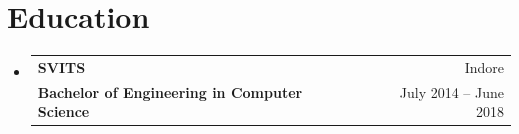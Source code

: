 \documentclass[letterpaper,11pt]{article}
\makeatletter
\newcommand{\resumeSubheading}[4]{
  \vspace{-2pt}\item
    \begin{tabular*}{0.97\textwidth}[t]{l@{\extracolsep{\fill}}r}
      \textbf{#1} & #2 \\
      \textbf{\small#3} & \textnormal{\small #4} \\
    \end{tabular*}\vspace{-7pt}
}
\newcommand{\resumeSubHeadingListStart}{\begin{itemize}[leftmargin=0.15in, label={}]}
\newcommand{\resumeSubHeadingListEnd}{\end{itemize}}
\makeatother
\begin{document}
\section{Education}
\small{
    \resumeSubHeadingListStart
        \resumeSubheading
            {SVITS}{Indore}
            {Bachelor of Engineering in Computer Science}{July 2014 -- June 2018}
    \resumeSubHeadingListEnd
}


\end{document}
